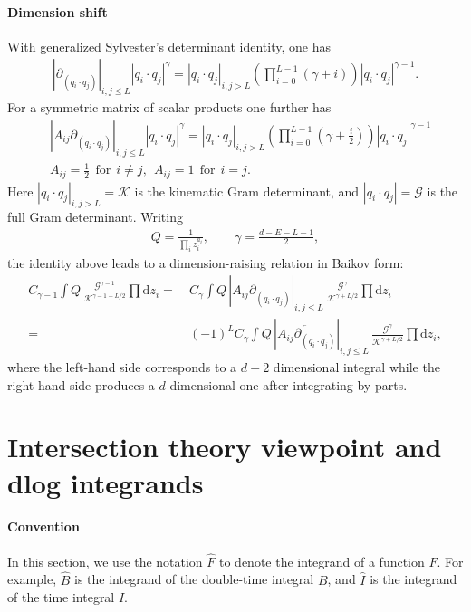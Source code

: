 \documentclass[a4paper,12pt]{article}
\newcommand{\n}{\nonumber}
\def\di{{\mathrm{d}}}
\newcommand{\mG}{\mathcal{G}}
\newcommand{\mK}{\mathcal{K}}
\begin{document}
\paragraph{Dimension shift}
With generalized Sylvester's determinant identity, one has
\begin{align}
	|\partial_{(q_i\cdotp q_j)}|_{i,j\leq L} |q_i\cdotp q_j|^\gamma
	= |q_i\cdotp q_j|_{i,j> L}\left(\prod_{i=0}^{L-1} (\gamma+i)\right)|q_i\cdotp q_j|^{\gamma-1}.
\end{align}
For a symmetric matrix of scalar products one further has
\begin{align}
	&|A_{ij} \partial_{(q_i\cdotp q_j)}|_{i,j\leq L} |q_i\cdotp q_j|^\gamma = |q_i\cdotp q_j|_{i,j> L}  \left(\prod_{i=0}^{L-1} \left(\gamma+\frac{i}{2}\right)\right)   |q_i\cdotp q_j|^{\gamma-1}  \n\\
	&A_{ij}=\frac{1}{2} ~~\text{for}~~i\neq j,  ~~A_{ij}=1 ~~\text{for}~~i=j.
\end{align}
Here $|q_i\cdotp q_j|_{i,j> L} = \mK$ is the kinematic Gram determinant, and $|q_i\cdotp q_j| = \mG$ is the full Gram determinant. Writing
\begin{align}
	Q=\frac{1}{\prod_i z_i^{a_i}},\qquad \gamma=\frac{d-E-L-1}{2},
\end{align}
the identity above leads to a dimension-raising relation in Baikov form:
\begin{align}
	C_{\gamma-1}\!\int Q\,\frac{\mG^{\gamma-1}}{\mK^{\gamma-1+L/2}}\prod \di z_i
	=&~C_{\gamma}\!\int Q\,|A_{ij} \partial_{(q_i\cdotp q_j)}|_{i,j\leq L}\,
	\frac{\mG^\gamma}{\mK^{\gamma+L/2}}\prod \di z_i \n\\
	=&~(-1)^L C_{\gamma}\!\int Q\,|\overleftarrow{A_{ij} \partial_{(q_i\cdotp q_j)}}|_{i,j\leq L}\,
	\frac{\mG^\gamma}{\mK^{\gamma+L/2}}\prod \di z_i,
\end{align}
where the left-hand side corresponds to a $d-2$ dimensional integral while the right-hand side produces a $d$ dimensional one after integrating by parts.

\section{Intersection theory viewpoint and dlog integrands}
\label{sec:dlog}

\paragraph{Convention}
In this section, we use the notation $\hat{F}$ to denote the integrand of a function $F$. For example, $\hat{B}$ is the integrand of the double-time integral $B$, and $\hat{I}$ is the integrand of the time integral $I$.
\end{document}
